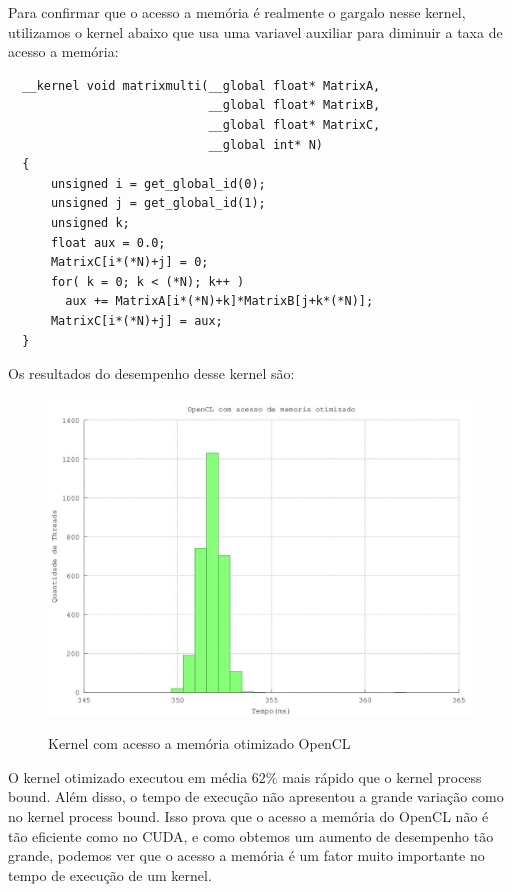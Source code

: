 Para confirmar que o acesso a memória é realmente o gargalo nesse kernel, utilizamos o kernel abaixo que usa uma variavel auxiliar
para diminuir a taxa de acesso a memória:

\begin{lstlisting}
  __kernel void matrixmulti(__global float* MatrixA, 
                            __global float* MatrixB, 
                            __global float* MatrixC, 
                            __global int* N)
  {
      unsigned i = get_global_id(0);
      unsigned j = get_global_id(1);
      unsigned k;
      float aux = 0.0;
      MatrixC[i*(*N)+j] = 0;
      for( k = 0; k < (*N); k++ ) 
      	aux += MatrixA[i*(*N)+k]*MatrixB[j+k*(*N)];
      MatrixC[i*(*N)+j] = aux;
  }
\end{lstlisting}

Os resultados do desempenho desse kernel são:

\begin{figure}[H]
  \begin{center}
    \includegraphics[scale=0.6]{resultados_opencl_aux_memory.jpg}
    \label{fig:Kernel Otimizado OpenCL}
    \caption{Kernel com acesso a memória otimizado OpenCL}
  \end{center}
\end{figure}

O kernel otimizado executou em média $62\%$ mais rápido que o kernel process bound. Além disso, o tempo de execução não apresentou a
grande variação como no kernel process bound. Isso prova que o acesso a memória do OpenCL não é tão eficiente como no CUDA, e como
obtemos um aumento de desempenho tão grande, podemos ver que o acesso a memória é um fator muito importante no tempo de execução
de um kernel.

